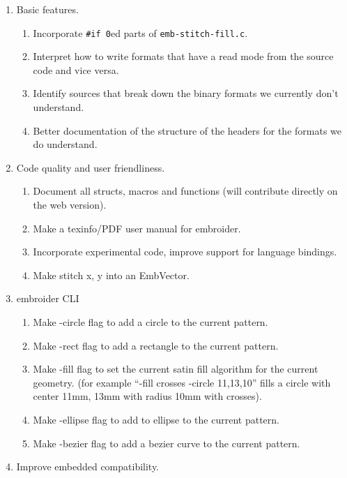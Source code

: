 \documentclass[onesize, a4paper]{refart}
\providecommand{\tightlist}{\setlength{\itemsep}{0pt}\setlength{\parskip}{0pt}}
\begin{document}
\begin{enumerate}
\def\labelenumi{\arabic{enumi}.}
\tightlist
\item Basic features.

  \begin{enumerate}
  \def\labelenumii{\arabic{enumii}.}
  \tightlist
  \item Incorporate \texttt{\#if\ 0}ed parts of \texttt{emb-stitch-fill.c}.
  \item Interpret how to write formats that have a read mode from the source
    code and vice versa.
  \item Identify sources that break down the binary formats we currently
    don't understand.
  \item Better documentation of the structure of the headers for the formats
    we do understand.
  \end{enumerate}
\item Code quality and user friendliness.

  \begin{enumerate}
  \def\labelenumii{\arabic{enumii}.}
  \tightlist
  \item Document all structs, macros and functions (will contribute directly
    on the web version).
  \item Make a texinfo/PDF user manual for embroider.
  \item Incorporate experimental code, improve support for language
    bindings.
  \item Make stitch x, y into an EmbVector.
  \end{enumerate}
\item embroider CLI

  \begin{enumerate}
  \def\labelenumii{\arabic{enumii}.}
  \tightlist
  \item Make -circle flag to add a circle to the current pattern.
  \item Make -rect flag to add a rectangle to the current pattern.
  \item Make -fill flag to set the current satin fill algorithm for the
    current geometry. (for example ``-fill crosses -circle 11,13,10''
    fills a circle with center 11mm, 13mm with radius 10mm with
    crosses).
  \item Make -ellipse flag to add to ellipse to the current pattern.
  \item Make -bezier flag to add a bezier curve to the current pattern.
  \end{enumerate}
\item Improve embedded compatibility.


\end{enumerate}
\end{document}
